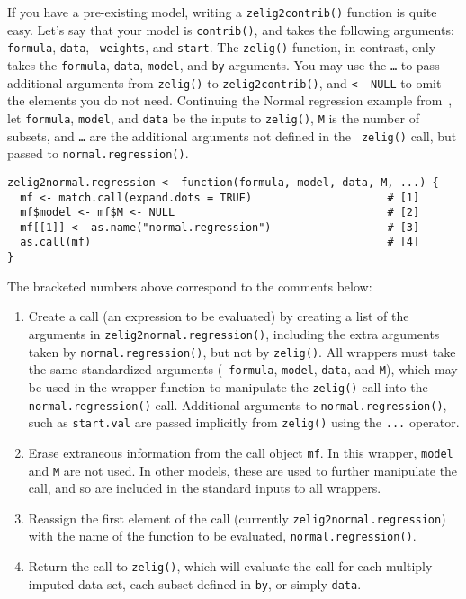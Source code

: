 If you have a pre-existing model, writing a {\tt zelig2contrib()}
function is quite easy.  Let's say that your model is {\tt contrib()},
and takes the following arguments: {\tt formula}, {\tt data}, {\tt
  weights}, and {\tt start}.  The {\tt zelig()} function, in contrast,
only takes the {\tt formula}, {\tt data}, {\tt model}, and {\tt by}
arguments.  You may use the {\tt \dots} to pass additional arguments
from {\tt zelig()} to {\tt zelig2contrib()}, and {\tt <- NULL} to omit
the elements you do not need.  Continuing the Normal regression example
from~, let {\tt formula}, {\tt model}, and {\tt data} be
the inputs to {\tt zelig()}, {\tt M} is the number of subsets, and
{\tt \dots} are the additional arguments not defined in the {\tt
  zelig()} call, but passed to {\tt normal.regression()}.
\begin{verbatim}
zelig2normal.regression <- function(formula, model, data, M, ...) {
  mf <- match.call(expand.dots = TRUE)                     # [1]
  mf$model <- mf$M <- NULL                                 # [2]
  mf[[1]] <- as.name("normal.regression")                  # [3]
  as.call(mf)                                              # [4] 
}
\end{verbatim}
The bracketed numbers above correspond to the comments below: 
\begin{enumerate}
\item Create a call (an expression to be evaluated) by
  creating a list of the arguments in {\tt zelig2normal.regression()}, including
  the extra arguments taken by {\tt normal.regression()}, but not by {\tt zelig()}.
  All wrappers must take the same standardized arguments ({\tt
    formula}, {\tt model}, {\tt data}, and {\tt M}), which may be used
  in the wrapper function to manipulate the {\tt zelig()} call into
  the {\tt normal.regression()} call.  Additional arguments to {\tt normal.regression()}, such
  as {\tt start.val} are passed implicitly from {\tt zelig()} using the
  {\tt ...} operator.
  
  \item Erase extraneous information from the call
    object {\tt mf}.  In this wrapper, {\tt model} and {\tt M} are not
    used.  In other models, these are used to further manipulate the
    call, and so are included in the standard inputs to all wrappers.

\item  Reassign the first element of the call
  (currently {\tt zelig2normal.regression}) with the name of the function to be
  evaluated, {\tt normal.regression()}.  

\item Return the call to {\tt zelig()}, which will
  evaluate the call for each multiply-imputed data set, each subset
  defined in {\tt by}, or simply {\tt data}.  
\end{enumerate}

